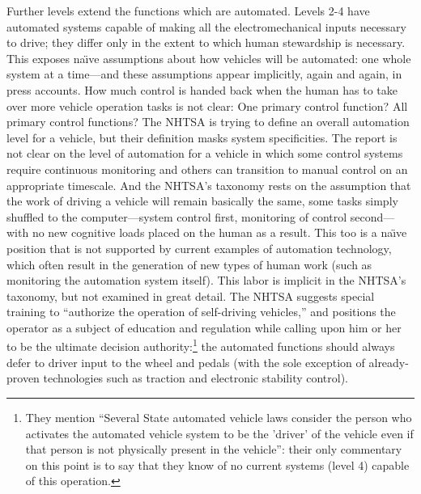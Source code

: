 Further levels extend the functions which are automated. Levels 2-4
have automated systems capable of making all the electromechanical
inputs necessary to drive; they differ only in the extent to which
human stewardship is necessary.\cite[p. 4--5]{NHTSA} This exposes na\"{\i}ve assumptions about
how vehicles will be automated:  one whole system at a time---and
these assumptions appear implicitly, again and again, in press
accounts. How much
control is handed back when the human has to take over more vehicle
operation tasks is not clear: One primary control function? All
primary control functions? The NHTSA is trying to define an overall
automation level for a vehicle, but their definition masks system
specificities. The report is not clear on the level of automation for
a vehicle in which some control systems require continuous monitoring
and others can transition to manual control on an appropriate
timescale. And the NHTSA's taxonomy rests on the assumption that the
work of driving a vehicle will remain basically the same, some tasks
simply shuffled to the computer---system control first, monitoring of
control second---with no new cognitive loads placed on the human as a
result. This too is a na\"{\i}ve position that is not supported by current
examples of automation technology, which often result in the
generation of new types of human work (such as monitoring the
automation system itself). This labor is implicit in the NHTSA's
taxonomy, but not examined in great detail. The NHTSA suggests special
training to ``authorize the operation of self-driving
vehicles,''\cite[p. 11]{NHTSA} and
positions the operator as a subject of education and regulation while
calling upon him or her to be the ultimate decision
authority:\footnote{They mention “Several State automated vehicle laws
consider the person who activates the automated vehicle system to be
the 'driver' of the vehicle even if that person is not physically
present in the vehicle”: their only commentary on this point is to say
that they know of no current systems (level 4) capable of this
operation.\cite[p. 5]{NHTSA}} the
automated functions should always defer to driver input to the wheel
and pedals (with the sole exception of already-proven technologies
such as traction and electronic stability control).\cite[p. 13]{NHTSA}

